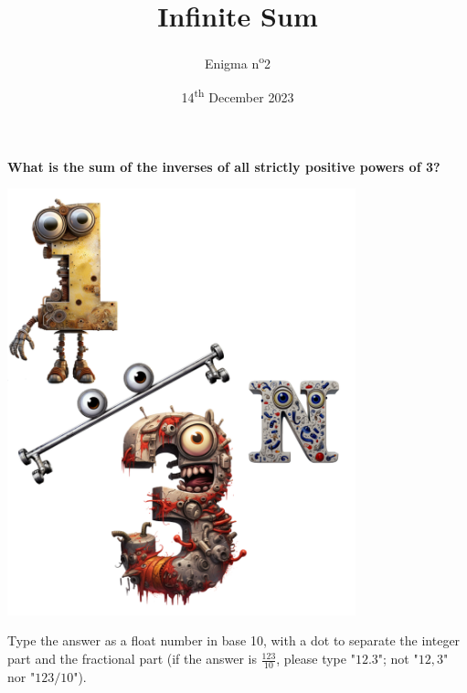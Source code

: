 \documentclass[a4paper, top=10mm]{article}
\title{\textbf{\huge{Infinite Sum}}}
\author{Enigma n\textsuperscript{o}2}
\date{14\textsuperscript{th} December 2023}
\begin{document}
	\maketitle
	
	\vspace{2cm}
	
	\Huge{\textbf{What is the sum of the inverses of all strictly positive powers of 3?}}
	
	\vspace{2cm}
	
	\begin{center}
		\includegraphics[height=350pt]{02_one_third_character.png}
	\end{center}
	
	\vspace{2cm}
	
	\normalsize
	Type the answer as a float number in base 10, with a dot to separate the integer part and the fractional part (if the answer is $\frac{123}{10}$, please type "$12.3$"; not "$12,3$" nor "$123/10$").
	
	
\end{document}
